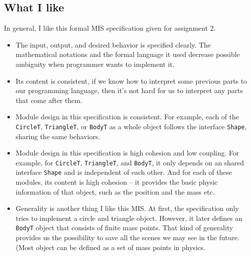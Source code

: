 \documentclass[12pt]{article}
\begin{document}
\subsection{What I like}
In general, I like this formal MIS specification given for assignment 2. 
\begin{itemize}
\item The input, output, and desired behavior is specified clearly. The mathematical notations and the formal language it used decrease possible ambiguity when programmer wants to implement it. 
\item  Its content is consistent, if we know how to interpret some previous parts to our programming language, then it's not hard for us to interpret any parts that come after them.
\item Module design in this specification is consistent. For example, each of the \verb|CircleT|, \verb|TriangleT|, or \verb|BodyT| as a whole object follows the interface \verb|Shape|, sharing the same behaviors.
\item Module design in this specification is high cohesion and low coupling. For example, for \verb|CircleT|, \verb|TriangleT|, and \verb|BodyT|, it only depends on an shared interface \verb|Shape| and is independent of each other. And for each of these modules, its content is high cohesion \--- it provides the basic physic information of that object, such as the position and the mass etc.
\item Generality is another thing I like this MIS. At first, the specification only tries to implement a circle and triangle object. However, it later defines an \verb|BodyT| object that consists of finite mass points. That kind of generality provides us the possibility to save all the scenes we may see in the future. (Most object can be defined as a set of mass points in physics.
\end{itemize}
\end{document}
